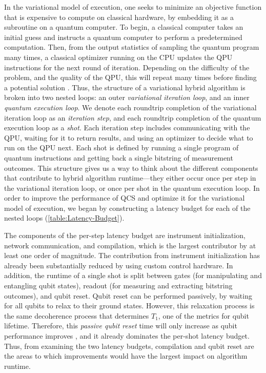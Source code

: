 \documentclass[12pt]{iopart}
\begin{document}
In the variational model of execution, one seeks to minimize an objective function \cite{NatureOfMathematicalProgramming} that is expensive to compute on classical hardware, by embedding it as a subroutine on a quantum computer. To begin, a classical computer takes an initial guess and instructs a quantum computer to perform a predetermined computation. Then, from the output statistics of sampling the quantum program many times, a classical optimizer running on the CPU updates the QPU instructions for the next round of iteration. Depending on the difficulty of the problem, and the quality of the QPU, this will repeat many times before finding a potential solution \cite{McCleanBarrenPlateaus}. Thus, the structure of a variational hybrid algorithm is broken into two nested loops: an outer \textit{variational iteration loop}, and an inner \textit{quantum execution loop}. We denote each roundtrip completion of the variational iteration loop as an \textit{iteration step}, and each roundtrip completion of the quantum execution loop as a \textit{shot}. Each iteration step includes communicating with the QPU, waiting for it to return results, and using an optimizer to decide what to run on the QPU next. Each shot is defined by running a single program of quantum instructions and getting back a single bitstring of measurement outcomes. This structure gives us a way to think about the different components that contribute to hybrid algorithm runtime---they either occur once per step in the variational iteration loop, or once per shot in the quantum execution loop. In order to improve the performance of QCS and optimize it for the variational model of execution, we began by constructing a latency budget for each of the nested loops (\cref{table:Latency-Budget}). 

The components of the per-step latency budget are instrument initialization, network communication, and compilation, which is the largest contributor by at least one order of magnitude. The contribution from instrument initialization has already been substantially reduced by using custom control hardware. In addition, the runtime of a single shot is split between gates (for manipulating and entangling qubit states), readout (for measuring and extracting bitstring outcomes), and qubit reset. Qubit reset can be performed passively, by waiting for all qubits to relax to their ground states. However, this relaxation process is the same decoherence process that determines $T_1$, one of the metrics for qubit lifetime. Therefore, this \textit{passive qubit reset} time will only increase as qubit performance improves \cite{RigettiFabT1, GyensisZeroPi}, and it already dominates the per-shot latency budget. Thus, from examining the two latency budgets, compilation and qubit reset are the areas to which improvements would have the largest impact on algorithm runtime.
\end{document}
